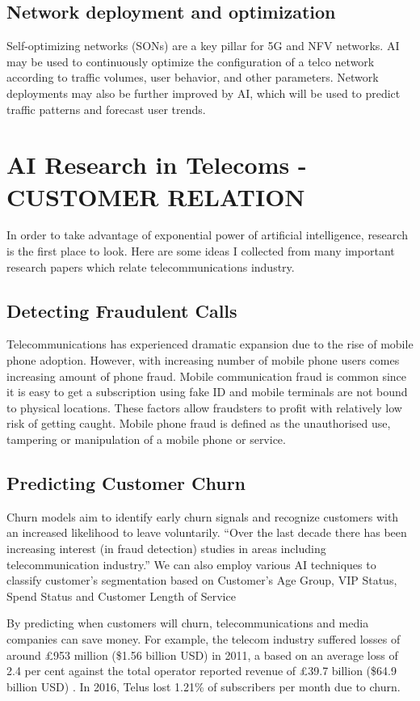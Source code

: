 \documentclass[12pt]{article}
\begin{document}
\subsection{Network deployment and optimization}
\noindent Self-optimizing networks (SONs) are a key pillar for 5G
and NFV networks. AI may be used to continuously optimize the configuration of a telco
network according to traffic volumes, user behavior, and other parameters. Network
deployments may also be further improved by AI, which will be used to predict traffic patterns
and forecast user trends.
\section{AI Research in Telecoms - CUSTOMER RELATION}
\noindent In order to take advantage of exponential power of artificial intelligence, research is the first place to look. Here are some ideas I collected from many important research papers which relate telecommunications industry.
\subsection{Detecting Fraudulent Calls}
\noindent Telecommunications has experienced dramatic expansion due to the rise of mobile phone adoption. However, with increasing number of mobile phone users comes increasing amount of phone fraud. Mobile communication fraud is common since it is easy to get a subscription using fake ID and mobile terminals are not bound to physical locations. These factors allow fraudsters to profit with relatively low risk of getting caught. Mobile phone fraud is defined as the unauthorised use, tampering or manipulation of a mobile phone or service.\cite{fraud1}
\subsection{Predicting Customer Churn}
\noindent Churn models aim to identify early churn signals and recognize customers with an increased likelihood to leave voluntarily. “Over the last decade there has been increasing interest (in fraud detection) studies in areas including telecommunication industry.” \cite{churn1}
\noindent We can also employ various AI techniques to classify customer’s segmentation based on Customer’s Age Group, VIP Status, Spend Status and Customer Length of Service \cite{segment1}

By predicting when customers will churn, telecommunications and media companies can save money. For example, the telecom industry suffered losses of around £953 million (\$1.56 billion USD) in 2011, a based on an average loss of 2.4 per cent against the total operator reported revenue of £39.7 billion (\$64.9 billion USD) \cite{fraud2}. In 2016, Telus lost 1.21\% of subscribers per month due to churn. \cite{telus}
\end{document}
